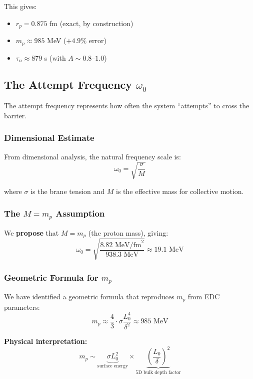 \documentclass[11pt,a4paper]{article}
\begin{document}
This gives:
\begin{itemize}
\item $r_p = 0.875$ fm (exact, by construction)
\item $m_p \approx 985$ MeV ($+4.9\%$ error)
\item $\tau_n \approx 879$ s (with $A \sim 0.8$--$1.0$)
\end{itemize}

\subsection{The Attempt Frequency $\omega_0$}

The attempt frequency represents how often the system ``attempts'' to cross the barrier.

\subsubsection{Dimensional Estimate}

From dimensional analysis, the natural frequency scale is:
\begin{equation}
\omega_0 = \sqrt{\frac{\sigma}{M}}
\end{equation}

where $\sigma$ is the brane tension and $M$ is the effective mass for collective motion.

\subsubsection{The $M = m_p$ Assumption}

We \textbf{propose} that $M = m_p$ (the proton mass), giving:
\begin{equation}
\omega_0 = \sqrt{\frac{8.82 \text{ MeV/fm}^2}{938.3 \text{ MeV}}} \approx 19.1 \text{ MeV}
\end{equation}

\subsubsection{Geometric Formula for $m_p$}

We have identified a geometric formula that reproduces $m_p$ from EDC parameters:
\begin{equation}
m_p \approx \frac{4}{3} \cdot \sigma \frac{L_0^4}{\delta^2} \approx 985 \text{ MeV}
\end{equation}

\textbf{Physical interpretation:}
\begin{equation}
m_p \sim \underbrace{\sigma L_0^2}_{\text{surface energy}} \times \underbrace{\left(\frac{L_0}{\delta}\right)^2}_{\text{5D bulk depth factor}}
\end{equation}
\end{document}
